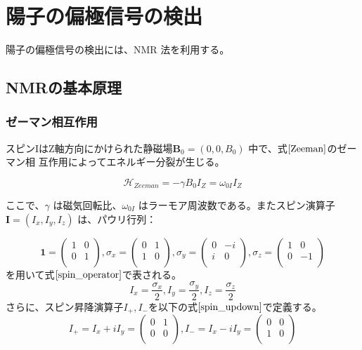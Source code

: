 \section{陽子の偏極信号の検出}
陽子の偏極信号の検出には、NMR 法を利用する。

\subsection{NMRの基本原理}
\subsubsection{ゼーマン相互作用}
スピンIはZ軸方向にかけられた静磁場$\textbf{B}_0 = (0, 0, B_0)$ 中で、式$\ref{Zeeman}$のゼーマン相
互作用によってエネルギー分裂が生じる。

\begin{equation}
  \mathcal{H}_{Zeeman}=-\gamma B_0 I_Z=\omega_{0I}I_Z
  \label{Zeeman}
\end{equation}


ここで、$\gamma$ は磁気回転比、$\omega_{0I}$ はラーモア周波数である。またスピン演算子 $\textbf{I} = (I_x , I_y , I_z)$
は、パウリ行列：

\begin{equation}
  \textbf{1}=
  \begin{pmatrix}
    1 & 0 \\
    0 & 1 \\
  \end{pmatrix}
  ,
  \sigma_x=
  \begin{pmatrix}
    0 & 1 \\
    1 & 0 \\
  \end{pmatrix}
  ,
  \sigma_y=
  \begin{pmatrix}
    0 & -i \\
    i & 0 \\
  \end{pmatrix}
  ,
  \sigma_z=
  \begin{pmatrix}
    1 & 0 \\
    0 & -1 \\
  \end{pmatrix}
  \label{pauli_matrix}
\end{equation}
を用いて式$\ref{spin_operator}$で表される。
\begin{equation}
  I_x=\frac{\sigma_x}{2},
  I_y=\frac{\sigma_y}{2},
  I_z=\frac{\sigma_z}{2}
  \label{spin_operator}
\end{equation}
さらに、スピン昇降演算子$I_+,I_-$を以下の式$\ref{spin_updown}$で定義する。
\begin{equation}
  I_+=I_x+iI_y=
  \begin{pmatrix}
    0 & 1 \\
    0 & 0 \\
  \end{pmatrix}
  ,I_-=I_x-iI_y=
  \begin{pmatrix}
    0 & 0 \\
    1 & 0 \\
  \end{pmatrix}
\label{spin_updown}
\end{equation}


